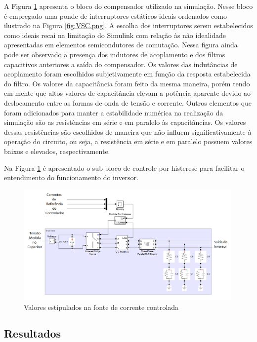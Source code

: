 A Figura \ref{fig:Inversor.png} apresenta o bloco do compensador utilizado na simulação. Nesse bloco é empregado uma ponde de interruptores estáticos ideais ordenados como ilustrado na Figura \ref{fig:VSC.png}. A escolha dos interruptores serem estabelecidos como ideais recai na limitação do Simulink com relação às não idealidade apresentadas em elementos semicondutores de comutação. Nessa figura ainda pode ser observado a presença dos indutores de acoplamento e dos filtros capacitivos anteriores a saída do compensador. Os valores das indutâncias de acoplamento foram escolhidos subjetivamente em função da resposta estabelecida do filtro. Os valores da capacitância foram feito da mesma maneira, porém tendo em mente que altos valores de capacitância elevam a potência aparente devido ao deslocamento entre as formas de onda de tensão e corrente. Outros elementos que foram adicionados para manter a estabilidade numérica na realização da simulação são as resistências em série e em paralelo às capacitâncias. Os valores dessas resistências são escolhidos de maneira que não influem significativamente à operação do circuito, ou seja, a resistência em série e em paralelo possuem valores baixos e elevados, respectivamente.

Na Figura \ref{fig:Inversor.png} é apresentado o sub-bloco de controle por histerese para facilitar o entendimento do funcionamento do inversor.
 
\begin{figure}[!htb] %
	\centering
	\includegraphics[width=0.99\textwidth]{Cap4/Figuras/Inversor.png}
	\caption{Valores estipulados na fonte de corrente controlada}
	\label{fig:Inversor.png}
\end{figure}

\subsection{Resultados}

